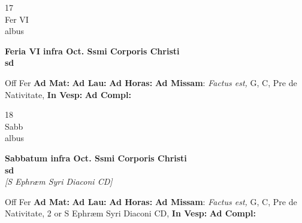 \documentclass[10pt, openany]{book}
\begin{document}
        \begin{center}
            \begin{minipage}{3.5in}
                \vspace{2em}
                \begin{minipage}{0.5in}
                    {\Huge 17} \\
                    {\normalsize Fer VI} \\
                    {\normalsize albus}
                \end{minipage}
                \begin{minipage}{3.0in}
                    \textbf{ \large Feria VI infra Oct. Ssmi Corporis Christi \\
                    \textnormal{\normalsize sd}} \\ 
                \end{minipage}
                \begin{justify}Off Fer
                    \textbf{Ad Mat: }
                    \textbf{Ad Lau: }
                    \textbf{Ad Horas: }\textbf{Ad Missam}: \textit{Factus est,} G, C, Pre de Nativitate,  
                    \textbf{In Vesp: }
                    \textbf{Ad Compl: }
                \end{justify}
            \end{minipage}
        \end{center}
    
        \begin{center}
            \begin{minipage}{3.5in}
                \vspace{2em}
                \begin{minipage}{0.5in}
                    {\Huge 18} \\
                    {\normalsize Sabb} \\
                    {\normalsize albus}
                \end{minipage}
                \begin{minipage}{3.0in}
                    \textbf{ \large Sabbatum infra Oct. Ssmi Corporis Christi \\
                    \textnormal{\normalsize sd}} \\ \textit{[S Ephræm Syri Diaconi CD]} \\ 
                \end{minipage}
                \begin{justify}Off Fer
                    \textbf{Ad Mat: }
                    \textbf{Ad Lau: }
                    \textbf{Ad Horas: }\textbf{Ad Missam}: \textit{Factus est,} G, C, Pre de Nativitate, 2 or S Ephræm Syri Diaconi CD,  
                    \textbf{In Vesp: }
                    \textbf{Ad Compl: }
                \end{justify}
            \end{minipage}
        \end{center}
    
\end{document}
